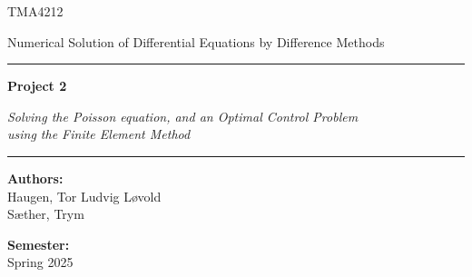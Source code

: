 \begin{titlepage}
    \newcommand{\HRule}{\rule{\linewidth}{0.5mm}}
  
    \center

    {\color{ntnu-blue}\sffamily\large TMA4212 \par}
    {\sffamily\Large Numerical Solution of Differential Equations by Difference Methods \par}
    
    \HRule
    \vspace{1.5cm}
  
    {\large\sffamily\bfseries Project 2\par}
    \vspace{0.3cm}
    {\Large\sffamily\textit{Solving the Poisson equation, and an Optimal Control Problem\\ using the Finite Element Method}\par}
  
    \vspace{0.5cm}
    \HRule
  
    \vfill
  
    \begin{minipage}{0.6\textwidth}
      \begin{flushleft}
        \large
        \textbf{Authors:}\\
        Haugen, Tor Ludvig Løvold \\
        Sæther, Trym\\ 
      \end{flushleft}
    \end{minipage}%
    \begin{minipage}{0.4\textwidth}
      \begin{flushright}
        \large
        \textbf{Semester:}\\
        Spring 2025
      \end{flushright}
    \end{minipage}
  

\end{titlepage}
